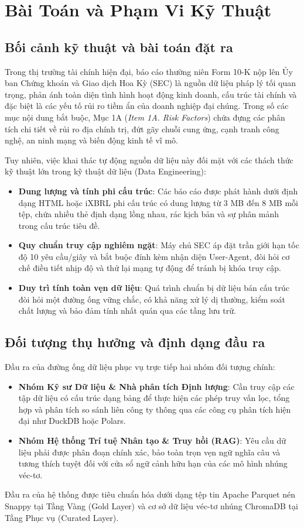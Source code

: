 \section{Bài Toán và Phạm Vi Kỹ Thuật}

\subsection{Bối cảnh kỹ thuật và bài toán đặt ra}
Trong thị trường tài chính hiện đại, báo cáo thường niên Form 10-K nộp lên Ủy ban Chứng khoán và Giao dịch Hoa Kỳ (SEC) là nguồn dữ liệu pháp lý tối quan trọng, phản ánh toàn diện tình hình hoạt động kinh doanh, cấu trúc tài chính và đặc biệt là các yếu tố rủi ro tiềm ẩn của doanh nghiệp đại chúng. Trong số các mục nội dung bắt buộc, Mục 1A (\textit{Item 1A. Risk Factors}) chứa đựng các phân tích chi tiết về rủi ro địa chính trị, đứt gãy chuỗi cung ứng, cạnh tranh công nghệ, an ninh mạng và biến động kinh tế vĩ mô.

Tuy nhiên, việc khai thác tự động nguồn dữ liệu này đối mặt với các thách thức kỹ thuật lớn trong kỹ thuật dữ liệu (Data Engineering):
\begin{itemize}
    \item \textbf{Dung lượng và tính phi cấu trúc}: Các báo cáo được phát hành dưới định dạng HTML hoặc iXBRL phi cấu trúc có dung lượng từ 3 MB đến 8 MB mỗi tệp, chứa nhiều thẻ định dạng lồng nhau, rác kịch bản và sự phân mảnh trong cấu trúc tiêu đề.
    \item \textbf{Quy chuẩn truy cập nghiêm ngặt}: Máy chủ SEC áp đặt trần giới hạn tốc độ 10 yêu cầu/giây và bắt buộc đính kèm nhận diện User-Agent, đòi hỏi cơ chế điều tiết nhịp độ và thử lại mạng tự động để tránh bị khóa truy cập.
    \item \textbf{Duy trì tính toàn vẹn dữ liệu}: Quá trình chuẩn bị dữ liệu bán cấu trúc đòi hỏi một đường ống vững chắc, có khả năng xử lý dị thường, kiểm soát chất lượng và bảo đảm tính nhất quán qua các tầng lưu trữ.
\end{itemize}

\subsection{Đối tượng thụ hưởng và định dạng đầu ra}
Đầu ra của đường ống dữ liệu phục vụ trực tiếp hai nhóm đối tượng chính:
\begin{itemize}
    \item \textbf{Nhóm Kỹ sư Dữ liệu \& Nhà phân tích Định lượng}: Cần truy cập các tập dữ liệu có cấu trúc dạng bảng để thực hiện các phép truy vấn lọc, tổng hợp và phân tích so sánh liên công ty thông qua các công cụ phân tích hiện đại như DuckDB hoặc Polars.
    \item \textbf{Nhóm Hệ thống Trí tuệ Nhân tạo \& Truy hồi (RAG)}: Yêu cầu dữ liệu phải được phân đoạn chính xác, bảo toàn trọn vẹn ngữ nghĩa câu và tương thích tuyệt đối với cửa sổ ngữ cảnh hữu hạn của các mô hình nhúng véc-tơ.
\end{itemize}
Đầu ra của hệ thống được tiêu chuẩn hóa dưới dạng tệp tin Apache Parquet nén Snappy tại Tầng Vàng (Gold Layer) và cơ sở dữ liệu véc-tơ nhúng ChromaDB tại Tầng Phục vụ (Curated Layer).

